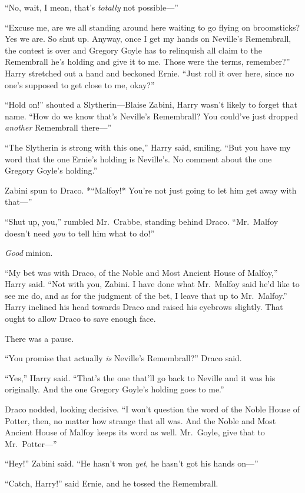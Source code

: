 ``No, wait, I mean, that's \emph{totally} not possible---''

``Excuse me, are we all standing around here waiting to go flying on
broomsticks? Yes we are. So shut up. Anyway, once I get my hands on
Neville's Remembrall, the contest is over and Gregory Goyle has to
relinquish all claim to the Remembrall he's holding and give it to me.
Those were the terms, remember?'' Harry stretched out a hand and
beckoned Ernie. ``Just roll it over here, since no one's supposed to get
close to me, okay?''

``Hold on!'' shouted a Slytherin---Blaise Zabini, Harry wasn't likely to
forget that name. ``How do we know that's Neville's Remembrall? You
could've just dropped \emph{another} Remembrall there---''

``The Slytherin is strong with this one,'' Harry said, smiling. ``But
you have my word that the one Ernie's holding is Neville's. No comment
about the one Gregory Goyle's holding.''

Zabini spun to Draco. *``Malfoy!* You're not just going to let him get
away with that---''

``Shut up, you,'' rumbled Mr.~Crabbe, standing behind Draco.
``Mr.~Malfoy doesn't need \emph{you} to tell him what to do!''

\emph{Good} minion.

``My bet was with Draco, of the Noble and Most Ancient House of
Malfoy,'' Harry said. ``Not with you, Zabini. I have done what
Mr.~Malfoy said he'd like to see me do, and as for the judgment of the
bet, I leave that up to Mr.~Malfoy.'' Harry inclined his head towards
Draco and raised his eyebrows slightly. That ought to allow Draco to
save enough face.

There was a pause.

``You promise that actually \emph{is} Neville's Remembrall?'' Draco
said.

``Yes,'' Harry said. ``That's the one that'll go back to Neville and it
was his originally. And the one Gregory Goyle's holding goes to me.''

Draco nodded, looking decisive. ``I won't question the word of the Noble
House of Potter, then, no matter how strange that all was. And the Noble
and Most Ancient House of Malfoy keeps its word as well. Mr.~Goyle, give
that to Mr.~Potter---''

``Hey!'' Zabini said. ``He hasn't won \emph{yet}, he hasn't got his
hands on---''

``Catch, Harry!'' said Ernie, and he tossed the Remembrall.

